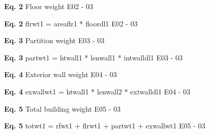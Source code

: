 \documentclass[12pt,notitle,letterpaper]{report}
\newenvironment{DUlineblock}[1]{%
    \list{}{\setlength{\partopsep}{\parskip}
            \addtolength{\partopsep}{\baselineskip}
            \setlength{\topsep}{0pt}
            \setlength{\itemsep}{0.15\baselineskip}
            \setlength{\parsep}{0pt}
            \setlength{\leftmargin}{#1}}
    \raggedright
  }
  {\endlist}
\begin{document}
\begin{DUlineblock}{0em}
\item[] 
\end{DUlineblock}

\textbf{Eq. 2} Floor weight \hfill E02 - 03

\begin{DUlineblock}{0em}
\item[] 
\end{DUlineblock}

\textbf{Eq. 2} flrwt1 = areaflr1 * floordl1 \hfill E02 - 03

\begin{DUlineblock}{0em}
\item[] 
\end{DUlineblock}

\textbf{Eq. 3} Partition weight \hfill E03 - 03

\begin{DUlineblock}{0em}
\item[] 
\end{DUlineblock}

\textbf{Eq. 3} partwt1 =  htwall1 * lenwall1 * intwalldl1 \hfill E03 - 03

\begin{DUlineblock}{0em}
\item[] 
\end{DUlineblock}

\textbf{Eq. 4} Exterior wall weight \hfill E04 - 03

\begin{DUlineblock}{0em}
\item[] 
\end{DUlineblock}

\textbf{Eq. 4} exwallwt1 = htwall1 * lenwall2 * extwalldl1 \hfill E04 - 03

\begin{DUlineblock}{0em}
\item[] 
\end{DUlineblock}

\textbf{Eq. 5} Total building weight \hfill E05 - 03

\begin{DUlineblock}{0em}
\item[] 
\end{DUlineblock}

\textbf{Eq. 5} totwt1 = rfwt1 + flrwt1 + partwt1 + exwallwt1 \hfill E05 - 03

\begin{DUlineblock}{0em}
\item[] 
\end{DUlineblock}
\end{document}
